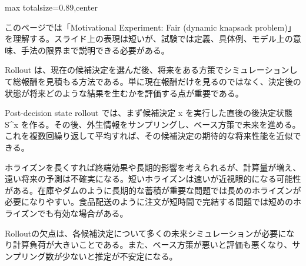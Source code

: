 \begin{minipage}[t]{0.58\textwidth}
\begin{adjustbox}{max totalsize={\textwidth}{0.89\textheight},center}
\begin{minipage}{\textwidth}\scriptsize
{}このページでは「Motivational Experiment: Fair (dynamic knapsack problem)」を理解する。スライド上の表現は短いが、試験では定義、具体例、モデル上の意味、手法の限界まで説明できる必要がある。\par
Rollout は、現在の候補決定を選んだ後、将来をある方策でシミュレーションして総報酬を見積もる方法である。単に現在報酬だけを見るのではなく、決定後の状態が将来どのような結果を生むかを評価する点が重要である。\par
Post-decision state rollout では、まず候補決定 x を実行した直後の後決定状態 S\textasciicircum{}x を作る。その後、外生情報をサンプリングし、ベース方策で未来を進める。これを複数回繰り返して平均すれば、その候補決定の期待的な将来性能を近似できる。\par
ホライズンを長くすれば終端効果や長期的影響を考えられるが、計算量が増え、遠い将来の予測は不確実になる。短いホライズンは速いが近視眼的になる可能性がある。在庫やダムのように長期的な蓄積が重要な問題では長めのホライズンが必要になりやすい。食品配送のように注文が短時間で完結する問題では短めのホライズンでも有効な場合がある。\par
Rolloutの欠点は、各候補決定について多くの未来シミュレーションが必要になり計算負荷が大きいことである。また、ベース方策が悪いと評価も悪くなり、サンプリング数が少ないと推定が不安定になる。\par

\end{minipage}
\end{adjustbox}
\end{minipage}

